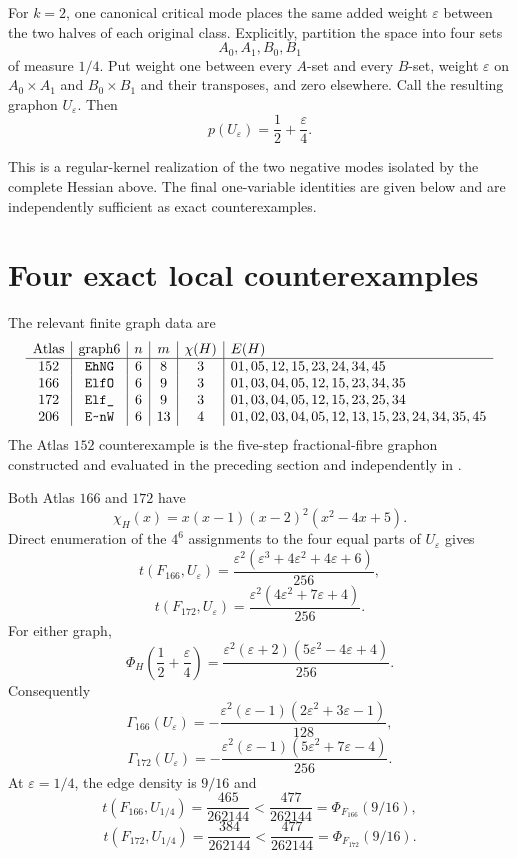 \documentclass[11pt]{article}
\begin{document}
For $k=2$, one canonical critical mode places the same added weight
$\varepsilon$ between the two halves of each original class.  Explicitly,
partition the space into four sets
\[
 A_0,A_1,B_0,B_1
\]
of measure $1/4$.  Put weight one between every $A$-set and every $B$-set,
weight $\varepsilon$ on $A_0\times A_1$ and $B_0\times B_1$ and their
transposes, and zero elsewhere.  Call the resulting graphon
$U_\varepsilon$.  Then
\[
 p(U_\varepsilon)=\frac12+\frac\varepsilon4.
\]

This is a regular-kernel realization of the two negative modes isolated by
the complete Hessian above.  The final one-variable identities are given
below and are independently sufficient as exact counterexamples.


\section{Four exact local counterexamples}

The relevant finite graph data are
\[
\begin{array}{c|c|c|c|c|l}
\text{Atlas}&\text{graph6}&n&m&\chi(H)&E(H)\\ \hline
152&\texttt{EhNG}&6&8&3&
01,05,12,15,23,24,34,45\\
166&\texttt{ElfO}&6&9&3&
01,03,04,05,12,15,23,34,35\\
172&\texttt{Elf\_}&6&9&3&
01,03,04,05,12,15,23,25,34\\
206&\texttt{E\char126 nW}&6&13&4&
01,02,03,04,05,12,13,15,23,24,34,35,45
\end{array}
\]
The Atlas $152$ counterexample is the five-step fractional-fibre graphon
constructed and evaluated in the preceding section and independently in
.

Both Atlas $166$ and $172$ have
\[
 \chi_H(x)=x(x-1)(x-2)^2(x^2-4x+5).
\]
Direct enumeration of the $4^6$ assignments to the four equal parts of
$U_\varepsilon$ gives
\[
 t(F_{166},U_\varepsilon)
 =\frac{\varepsilon^2
 (\varepsilon^3+4\varepsilon^2+4\varepsilon+6)}{256},
\]
\[
 t(F_{172},U_\varepsilon)
 =\frac{\varepsilon^2(4\varepsilon^2+7\varepsilon+4)}{256}.
\]
For either graph,
\[
 \Phi_H\!\left(\frac12+\frac\varepsilon4\right)
 =\frac{\varepsilon^2(\varepsilon+2)
 (5\varepsilon^2-4\varepsilon+4)}{256}.
\]
Consequently
\[
 \Gamma_{166}(U_\varepsilon)
 =-\frac{\varepsilon^2(\varepsilon-1)
 (2\varepsilon^2+3\varepsilon-1)}{128},
\]
\[
 \Gamma_{172}(U_\varepsilon)
 =-\frac{\varepsilon^2(\varepsilon-1)
 (5\varepsilon^2+7\varepsilon-4)}{256}.
\]
At $\varepsilon=1/4$, the edge density is $9/16$ and
\[
 t(F_{166},U_{1/4})
 =\frac{465}{262144}
 <\frac{477}{262144}
 =\Phi_{F_{166}}(9/16),
\]
\[
 t(F_{172},U_{1/4})
 =\frac{384}{262144}
 <\frac{477}{262144}
 =\Phi_{F_{172}}(9/16).
\]
\end{document}
